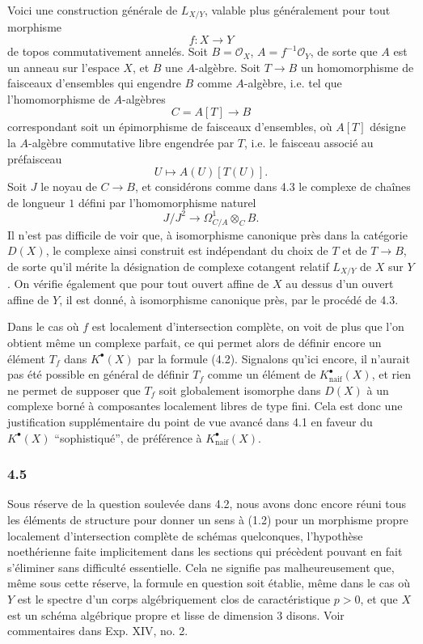 \documentclass[11pt]{article}
\begin{document}
Voici une construction g\'en\'erale de $L_{X/Y}$, valable plus g\'en\'eralement pour tout morphisme
\[
f:X\longrightarrow Y
\]
de topos commutativement annel\'es. Soit $B=\mathcal O_X$, $A=f^{-1}\mathcal O_Y$, de sorte que $A$ est un anneau sur l'espace $X$, et $B$ une $A$-alg\`ebre. Soit $T\to B$ un homomorphisme de faisceaux d'ensembles qui engendre $B$ comme $A$-alg\`ebre, i.e. tel que l'homomorphisme de $A$-alg\`ebres
\[
C=A[T]\longrightarrow B
\]
correspondant soit un \'epimorphisme de faisceaux d'ensembles, o\`u $A[T]$ d\'esigne la $A$-alg\`ebre commutative libre engendr\'ee par $T$, i.e. le faisceau associ\'e au pr\'efaisceau
\[
U\longmapsto A(U)[T(U)].
\]
Soit $J$ le noyau de $C\to B$, et consid\'erons comme dans 4.3 le complexe de cha\^ines de longueur $1$ d\'efini par l'homomorphisme naturel
\[
J/J^2\longrightarrow \Omega^1_{C/A}\otimes_C B.
\]
Il n'est pas difficile de voir que, \`a isomorphisme canonique pr\`es dans la cat\'egorie $D(X)$, le complexe ainsi construit est ind\'ependant du choix de $T$ et de $T\to B$, de sorte qu'il m\'erite la d\'esignation de complexe cotangent relatif $L_{X/Y}$ de $X$ sur $Y$. On v\'erifie \'egalement que pour tout ouvert affine de $X$ au dessus d'un ouvert affine de $Y$, il est donn\'e, \`a isomorphisme canonique pr\`es, par le proc\'ed\'e de 4.3.

Dans le cas o\`u $f$ est localement d'intersection compl\`ete, on voit de plus que l'on obtient m\^eme un complexe parfait, ce qui permet alors de d\'efinir encore un \'el\'ement $T_f$ dans $K^\bullet(X)$ par la formule (4.2). Signalons qu'ici encore, il n'aurait pas \'et\'e possible en g\'en\'eral de d\'efinir $T_f$ comme un \'el\'ement de $K^\bullet_{\mathrm{naif}}(X)$, et rien ne permet de supposer que $T_f$ soit globalement isomorphe dans $D(X)$ \`a un complexe born\'e \`a composantes localement libres de type fini. Cela est donc une justification suppl\'ementaire du point de vue avanc\'e dans 4.1 en faveur du $K^\bullet(X)$ ``sophistiqu\'e'', de pr\'ef\'erence \`a $K^\bullet_{\mathrm{naif}}(X)$.

\subsubsection*{4.5}
Sous r\'eserve de la question soulev\'ee dans 4.2, nous avons donc encore r\'euni tous les \'el\'ements de structure pour donner un sens \`a (1.2) pour un morphisme propre localement d'intersection compl\`ete de sch\'emas quelconques, l'hypoth\`ese noeth\'erienne faite implicitement dans les sections qui pr\'ec\`edent pouvant en fait s'\'eliminer sans difficult\'e essentielle. Cela ne signifie pas malheureusement que, m\^eme sous cette r\'eserve, la formule en question soit \'etablie, m\^eme dans le cas o\`u $Y$ est le spectre d'un corps alg\'ebriquement clos de caract\'eristique $p>0$, et que $X$ est un sch\'ema alg\'ebrique propre et lisse de dimension $3$ disons. Voir commentaires dans Exp. XIV, no. 2.
\end{document}
